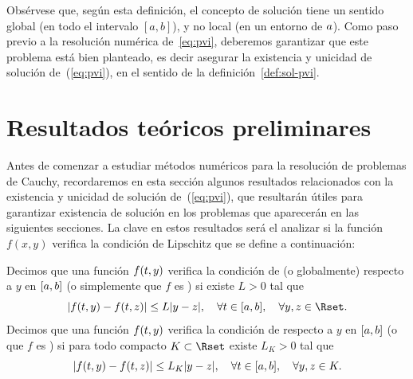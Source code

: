 
Obsérvese que, según esta definición, el concepto de solución tiene un
sentido global (en todo el intervalo $[a,b]$), y no local (en un entorno
de $\ta$). Como paso previo a la resolución numérica
de~\eqref{eq:pvi}, deberemos garantizar que este problema está bien
planteado, es decir asegurar la existencia y unicidad de solución
de~(\ref{eq:pvi}), en el sentido de la definición~\ref{def:sol-pvi}.

\section{Resultados teóricos preliminares}
\label{sec:tema4:resultados-teoricos}

Antes de comenzar a estudiar métodos numéricos para la resolución de
problemas de Cauchy, recordaremos en esta sección algunos
resultados relacionados con la existencia y unicidad de solución
de~(\ref{eq:pvi}), que resultarán útiles para garantizar existencia de
solución en los problemas que aparecerán en las siguientes secciones.
La clave en estos resultados será el analizar si la función $f(x,y)$
verifica la condición de Lipschitz que se define a continuación:

\begin{definition}
  \label{def:lipschitz}
  Decimos que una función $f(\tt,y)$ verifica la condición de
   (o globalmente) respecto a $y$ en
    $[\ta,\tb]$ (o simplemente que $f$ es \globLipschitz)
    si existe $L>0$ tal que
  \begin{equation*}
    |f(\tt,y) - f(\tt,z)| \le L |y-z|, \quad \forall \tt\in [\ta,\tb],
    \quad  \forall y,z\in \Rset.
  \end{equation*}
  Decimos que una función $f(\tt,y)$ verifica la condición de
   respecto a $y$ en
  $[\ta,\tb]$ (o que $f$ es \locLipschitz) si para todo compacto
  $K\subset\Rset$ existe $L_K>0$ tal que
  \begin{equation*}
    |f(\tt,y) - f(\tt,z)| \le L_K |y-z|, \quad \forall \tt\in [\ta,\tb],
    \quad  \forall y,z\in K.
  \end{equation*}
\end{definition}

